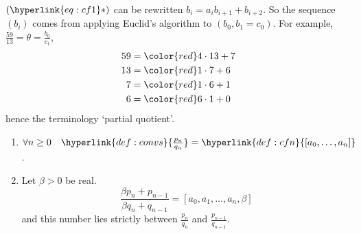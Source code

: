 \documentclass{article}
\begin{document}
\begin{remark}
    $(\hyperlink{eq:cf1}*)$ can be rewritten $b_i = a_i b_{i+1} + b_{i+2}$.
    So the sequence $(b_i)$ comes from applying Euclid's algorithm to $(b_0, b_1=c_0)$.
    For example, $\frac{59}{13} = \theta = \frac{b_0}{c_1}$,
    \begin{align*}
        59 &= {\color{red}4} \cdot 13 + 7 \\
        13 &= {\color{red}1} \cdot 7 + 6 \\
        7  &= {\color{red}1} \cdot 6 + 1 \\
        6  &= {\color{red}6} \cdot 1 + 0
    \end{align*}
    hence the terminology `partial quotient'.
\end{remark}


\begin{nlemma}\label{lem:6.2}
    \leavevmode
    \begin{enumerate}[label=(\roman*)]
        \item $\forall n \geq 0 \quad \hyperlink{def:convs}{\frac{p_n}{q_n}} = \hyperlink{def:cfn}{[a_0, \dotsc, a_n]}$.
        \item Let $\beta > 0$ be real.
            \begin{equation*}
                \frac{\beta p_n + p_{n-1}}{\beta q_n + q_{n-1}} = [a_0, a_1, \dotsc, a_n, \beta]
            \end{equation*}
            and this number lies strictly between $\frac{p_n}{q_n}$ and $\frac{p_{n-1}}{q_{n-1}}$.
    \end{enumerate}
\end{nlemma}
\end{document}
